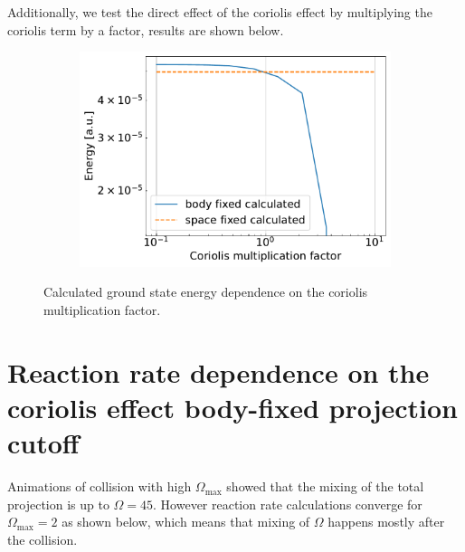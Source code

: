 \documentclass{article}
\begin{document}
    Additionally, we test the direct effect of the coriolis effect by multiplying
    the coriolis term by a factor, results are shown below.

    \begin{figure}[H]
        \centering
        \begin{subfigure}{.7\linewidth}
            \centering
            \includegraphics[width=\linewidth]{coriolis_convergence_test.pdf}
        \end{subfigure} 
        \caption{Calculated ground state energy dependence on the coriolis multiplication factor.}
    \end{figure}

\section{Reaction rate dependence on the coriolis effect body-fixed projection cutoff}
    Animations of collision with high $\Omega_\text{max}$ showed that the mixing of 
    the total projection is up to $\Omega = 45$. However reaction rate calculations converge 
    for $\Omega_\text{max} = 2$ as shown below, which means that mixing of $\Omega$ happens mostly after the collision.
\end{document}
